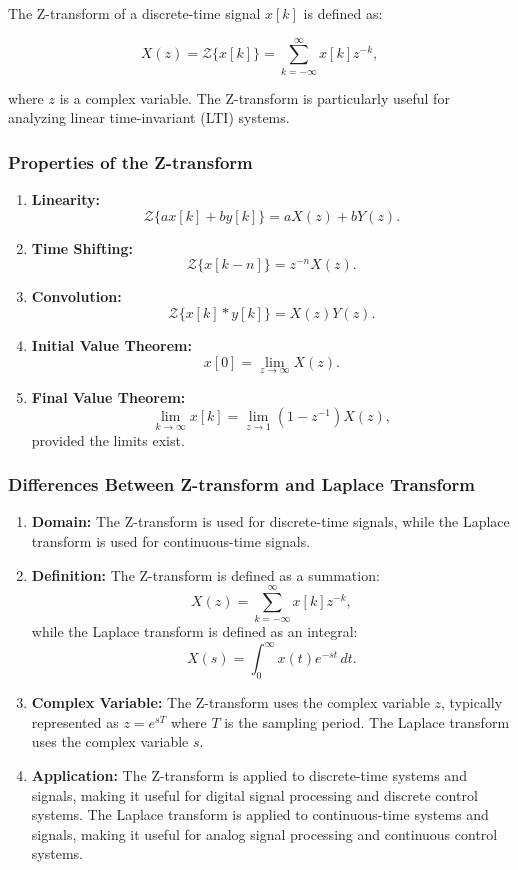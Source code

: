 \documentclass[a4 paper]{article}
\numberwithin{equation}{section}
\theoremstyle{boldStyle}
\theoremstyle{boldBlueStyle}
\theoremstyle{boldPurpleStyle}
\theoremstyle{boldRedStyle}
\theoremstyle{boldGreenStyle}
\begin{document}
The Z-transform of a discrete-time signal \( x[k] \) is defined as:

\[
X(z) = \mathcal{Z}\{x[k]\} = \sum_{k=-\infty}^{\infty} x[k] z^{-k},
\]

where \( z \) is a complex variable. The Z-transform is particularly useful for analyzing linear time-invariant (LTI) systems.

\subsubsection{Properties of the Z-transform}
\begin{enumerate}
  \item \textbf{Linearity:}
  \[
  \mathcal{Z}\{a x[k] + b y[k]\} = a X(z) + b Y(z).
  \]

  \item \textbf{Time Shifting:}
  \[
  \mathcal{Z}\{x[k-n]\} = z^{-n} X(z).
  \]

  \item \textbf{Convolution:}
  \[
  \mathcal{Z}\{x[k] * y[k]\} = X(z) Y(z).
  \]

  \item \textbf{Initial Value Theorem:}
  \[
  x[0] = \lim_{z \to \infty} X(z).
  \]

  \item \textbf{Final Value Theorem:}
  \[
  \lim_{k \to \infty} x[k] = \lim_{z \to 1} (1 - z^{-1}) X(z),
  \]
  provided the limits exist.
\end{enumerate}



\subsubsection{Differences Between Z-transform and Laplace Transform}

\begin{enumerate}
  \item \textbf{Domain:}
  The Z-transform is used for discrete-time signals, while the Laplace transform is used for continuous-time signals.

  \item \textbf{Definition:}
  The Z-transform is defined as a summation:
  \[
  X(z) = \sum_{k=-\infty}^{\infty} x[k] z^{-k},
  \]
  while the Laplace transform is defined as an integral:
  \[
  X(s) = \int_{0}^{\infty} x(t) e^{-st} \, dt.
  \]

  \item \textbf{Complex Variable:}
  The Z-transform uses the complex variable \( z \), typically represented as \( z = e^{sT} \) where \( T \) is the sampling period. The Laplace transform uses the complex variable \( s \).

  \item \textbf{Application:}
  The Z-transform is applied to discrete-time systems and signals, making it useful for digital signal processing and discrete control systems. The Laplace transform is applied to continuous-time systems and signals, making it useful for analog signal processing and continuous control systems.
\end{enumerate}
\end{document}
